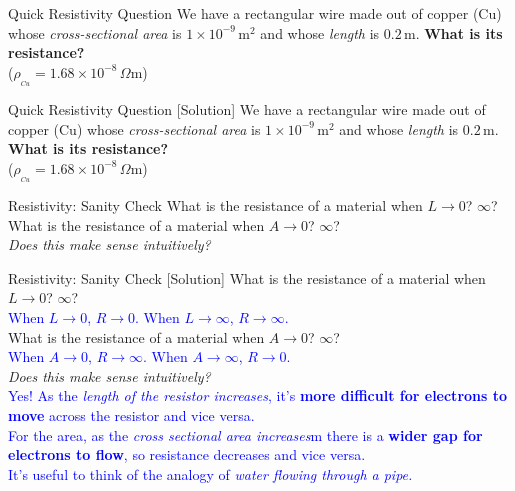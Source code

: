 \begin{frame}{Quick Resistivity Question}
    We have a rectangular wire made out of copper (Cu) whose \textit{cross-sectional area} is $1\times10^{-9} \, \text{m}^2$ and whose \textit{length} is $0.2 \, \text{m}$. \textbf{What is its resistance?}\\[2ex]

    ($\rho_{_{Cu}} = 1.68 \times 10^{-8} \, \Omega \text{m}$)
\end{frame}

\begin{frame}{Quick Resistivity Question [Solution]}
    We have a rectangular wire made out of copper (Cu) whose \textit{cross-sectional area} is $1\times10^{-9} \, \text{m}^2$ and whose \textit{length} is $0.2 \, \text{m}$. \textbf{What is its resistance?}\\[2ex]

    ($\rho_{_{Cu}} = 1.68 \times 10^{-8} \, \Omega \text{m}$)

\end{frame}

\begin{frame}{Resistivity: Sanity Check}
    What is the resistance of a material when $L \to 0$? $\infty$? \\[2ex]
    What is the resistance of a material when $A \to 0$? $\infty$? \\[4ex]
    \textit{Does this make sense intuitively?}
\end{frame}

\begin{frame}{Resistivity: Sanity Check [Solution]}
    What is the resistance of a material when $L \to 0$? $\infty$? \\
    \textcolor{blue}{
        When $L \to 0$, $R \to 0$. When $L \to \infty$, $R \to \infty$. \\[2ex]
    }
    What is the resistance of a material when $A \to 0$? $\infty$? \\
    \textcolor{blue}{
        When $A \to 0$, $R \to \infty$. When $A \to \infty$, $R \to 0$. \\[3ex]
    }
    \textit{Does this make sense intuitively?}\\
    \textcolor{blue}{
        Yes! As the \textit{length of the resistor increases}, it’s \textbf{more difficult for electrons to move} across the resistor and vice versa. \\[0.5ex]
        For the area, as the \textit{cross sectional area increases}m there is a \textbf{wider gap for electrons to flow}, so resistance decreases and vice versa. \\[0.5ex]
        It’s useful to think of the analogy of \textit{water flowing through a pipe.}
    }
\end{frame}

